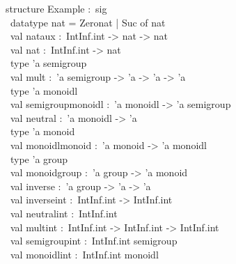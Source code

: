 \begin{isabellebody}
\isamarkuptrue%
%
\isadelimquote
%
\endisadelimquote
%
\isatagquote
%
\begin{isamarkuptext}%
\isatypewriter%
\noindent%
\hspace*{0pt}structure Example :~sig\\
\hspace*{0pt} ~datatype nat = Zero{}nat | Suc of nat\\
\hspace*{0pt} ~val nat{}aux :~IntInf.int -> nat -> nat\\
\hspace*{0pt} ~val nat :~IntInf.int -> nat\\
\hspace*{0pt} ~type 'a semigroup\\
\hspace*{0pt} ~val mult :~'a semigroup -> 'a -> 'a -> 'a\\
\hspace*{0pt} ~type 'a monoidl\\
\hspace*{0pt} ~val semigroup{}monoidl :~'a monoidl -> 'a semigroup\\
\hspace*{0pt} ~val neutral :~'a monoidl -> 'a\\
\hspace*{0pt} ~type 'a monoid\\
\hspace*{0pt} ~val monoidl{}monoid :~'a monoid -> 'a monoidl\\
\hspace*{0pt} ~type 'a group\\
\hspace*{0pt} ~val monoid{}group :~'a group -> 'a monoid\\
\hspace*{0pt} ~val inverse :~'a group -> 'a -> 'a\\
\hspace*{0pt} ~val inverse{}int :~IntInf.int -> IntInf.int\\
\hspace*{0pt} ~val neutral{}int :~IntInf.int\\
\hspace*{0pt} ~val mult{}int :~IntInf.int -> IntInf.int -> IntInf.int\\
\hspace*{0pt} ~val semigroup{}int :~IntInf.int semigroup\\
\hspace*{0pt} ~val monoidl{}int :~IntInf.int monoidl\\

\end{isamarkuptext}
\end{isabellebody}
